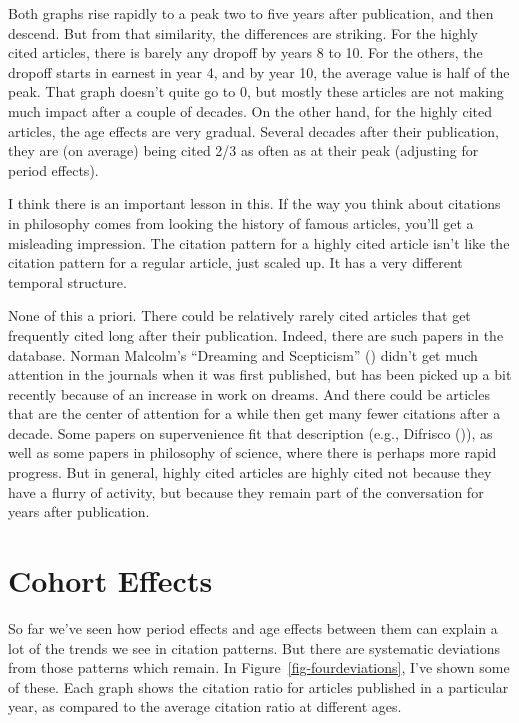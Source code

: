 \documentclass[
  12pt,
  letterpaper,
  DIV=11,
  numbers=noendperiod]{scrartcl}
\begin{document}
Both graphs rise rapidly to a peak two to five years after publication,
and then descend. But from that similarity, the differences are
striking. For the highly cited articles, there is barely any dropoff by
years 8 to 10. For the others, the dropoff starts in earnest in year 4,
and by year 10, the average value is half of the peak. That graph
doesn't quite go to 0, but mostly these articles are not making much
impact after a couple of decades. On the other hand, for the highly
cited articles, the age effects are very gradual. Several decades after
their publication, they are (on average) being cited 2/3 as often as at
their peak (adjusting for period effects).

I think there is an important lesson in this. If the way you think about
citations in philosophy comes from looking the history of famous
articles, you'll get a misleading impression. The citation pattern for a
highly cited article isn't like the citation pattern for a regular
article, just scaled up. It has a very different temporal structure.

None of this a priori. There could be relatively rarely cited articles
that get frequently cited long after their publication. Indeed, there
are such papers in the database. Norman Malcolm's ``Dreaming and
Scepticism'' () didn't get
much attention in the journals when it was first published, but has been
picked up a bit recently because of an increase in work on dreams. And
there could be articles that are the center of attention for a while
then get many fewer citations after a decade. Some papers on
supervenience fit that description (e.g., Difrisco
()), as well as some papers in
philosophy of science, where there is perhaps more rapid progress. But
in general, highly cited articles are highly cited not because they have
a flurry of activity, but because they remain part of the conversation
for years after publication.

\section{Cohort Effects}\label{sec-cohort}

So far we've seen how period effects and age effects between them can
explain a lot of the trends we see in citation patterns. But there are
systematic deviations from those patterns which remain. In
Figure~\ref{fig-fourdeviations}, I've shown some of these. Each graph
shows the citation ratio for articles published in a particular year, as
compared to the average citation ratio at different ages.
\end{document}
